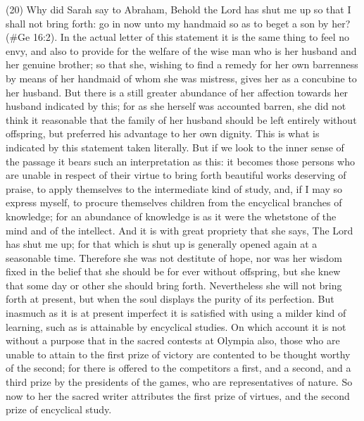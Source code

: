 (20) Why did Sarah say to Abraham, Behold the Lord has shut me up so that I shall not bring forth:
go in now unto my handmaid so as to beget a son by her? (\#Ge 16:2). In the actual letter of
this statement it is the same thing to feel no envy, and also to provide for the welfare of the wise
man who is her husband and her genuine brother; so that she, wishing to find a remedy for her own
barrenness by means of her handmaid of whom she was mistress, gives her as a concubine to her
husband. But there is a still greater abundance of her affection towards her husband indicated by
this; for as she herself was accounted barren, she did not think it reasonable that the family of her
husband should be left entirely without offspring, but preferred his advantage to her own dignity.
This is what is indicated by this statement taken literally. But if we look to the inner sense of the
passage it bears such an interpretation as this: it becomes those persons who are unable in
respect of their virtue to bring forth beautiful works deserving of praise, to apply themselves to the
intermediate kind of study, and, if I may so express myself, to procure themselves children from
the encyclical branches of knowledge; for an abundance of knowledge is as it were the whetstone
of the mind and of the intellect. And it is with great propriety that she says, The Lord has shut me
up; for that which is shut up is generally opened again at a seasonable time. Therefore she was
not destitute of hope, nor was her wisdom fixed in the belief that she should be for ever without
offspring, but she knew that some day or other she should bring forth. Nevertheless she will not
bring forth at present, but when the soul displays the purity of its perfection. But inasmuch as it is at
present imperfect it is satisfied with using a milder kind of learning, such as is attainable by
encyclical studies. On which account it is not without a purpose that in the sacred contests at
Olympia also, those who are unable to attain to the first prize of victory are contented to be thought
worthy of the second; for there is offered to the competitors a first, and a second, and a third prize
by the presidents of the games, who are representatives of nature. So now to her the sacred writer
attributes the first prize of virtues, and the second prize of encyclical study.

